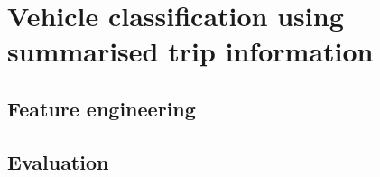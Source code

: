 \section{Vehicle classification using summarised trip information}

\subsection{Feature engineering}

\subsection{Evaluation}
